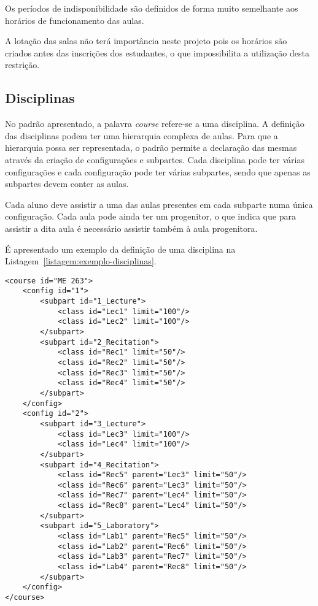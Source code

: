 Os períodos de indisponibilidade são definidos de forma muito semelhante aos horários de funcionamento das aulas.

A lotação das salas não terá importância neste projeto pois os horários são criados antes das inscrições dos estudantes, o que impossibilita a utilização desta restrição.

\subsection{Disciplinas}

No padrão apresentado, a palavra \textit{course} refere-se a uma disciplina. A definição das disciplinas podem ter uma hierarquia complexa de aulas. Para que a hierarquia possa ser representada, o padrão permite a declaração das mesmas através da criação de configurações e subpartes. Cada disciplina pode ter várias configurações e cada configuração pode ter várias subpartes, sendo que apenas as subpartes devem conter as aulas.

Cada aluno deve assistir a uma das aulas presentes em cada subparte numa única configuração. Cada aula pode ainda ter um progenitor, o que indica que para assistir a dita aula é necessário assistir também à aula progenitora.

É apresentado um exemplo da definição de uma disciplina na Listagem~\ref{listagem:exemplo-disciplinas}.

\begin{minipage}[c]{\linewidth}
    \begin{lstlisting}[caption={Exemplo da definição de uma disciplina.}, label={listagem:exemplo-disciplinas}]
<course id="ME 263">
    <config id="1">
        <subpart id="1_Lecture">
            <class id="Lec1" limit="100"/>
            <class id="Lec2" limit="100"/>
        </subpart>
        <subpart id="2_Recitation">
            <class id="Rec1" limit="50"/>
            <class id="Rec2" limit="50"/>
            <class id="Rec3" limit="50"/>
            <class id="Rec4" limit="50"/>
        </subpart>
    </config>
    <config id="2">
        <subpart id="3_Lecture">
            <class id="Lec3" limit="100"/>
            <class id="Lec4" limit="100"/>
        </subpart>
        <subpart id="4_Recitation">
            <class id="Rec5" parent="Lec3" limit="50"/>
            <class id="Rec6" parent="Lec3" limit="50"/>
            <class id="Rec7" parent="Lec4" limit="50"/>
            <class id="Rec8" parent="Lec4" limit="50"/>
        </subpart>
        <subpart id="5_Laboratory">
            <class id="Lab1" parent="Rec5" limit="50"/>
            <class id="Lab2" parent="Rec6" limit="50"/>
            <class id="Lab3" parent="Rec7" limit="50"/>
            <class id="Lab4" parent="Rec8" limit="50"/>
        </subpart>
    </config>
</course>
    \end{lstlisting}
\end{minipage}

